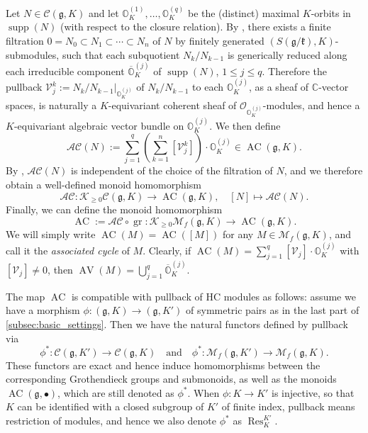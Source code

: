 \documentclass[11pt, a4paper]{amsart}
\newcommand{\C}{\mathbb{C}}
\newcommand{\g}{\mathfrak{g}}
\newcommand{\orb}{\mathbb{O}}
\newcommand{\orbk}{\orb_{K}}
\newcommand{\gr}{\operatorname{gr}}
\newcommand{\fk}{\mathfrak{k}}
\newcommand{\cC}{\mathcal{C}}
\newcommand{\cK}{\mathcal{K}}
\newcommand{\cM}{\mathcal{M}}
\newcommand{\cV}{\mathcal{V}}
\newcommand{\MgK}{\cM_f(\g,K)}
\DeclareMathOperator{\AV}{AV}
\DeclareMathOperator{\AC}{AC}
\DeclareMathOperator{\supp}{supp}
\DeclareMathOperator{\res}{Res}
\newcommand{\OO}{\mathcal{O}}
\theoremstyle{definition}
\numberwithin{equation}{section}
\begin{document}
Let $N \in \cC(\g,K)$ and let $\orbk^{(1)},\ldots ,\orbk^{(q)}$ be the (distinct) maximal $K$-orbits in $\supp(N)$ (with respect to the closure relation). 
By \cite[Lemma 2.9]{Vogan_AV}, there exists a finite filtration $0=N_0 \subset N_1 \subset \cdots \subset N_n$ of $N$ by finitely generated $(S(\g/\fk),K)$-submodules, such that each subquotient $N_k/N_{k-1}$ is generically reduced along each irreducible component $\overline{\orb}_K^{(j)}$ of $\supp(N)$, $1 \leqslant j \leqslant q$. Therefore the pullback $\cV_j^k:=N_k/N_{k-1}|_{\orbk^{(j)}}$ of $N_k/N_{k-1}$ to each $\orbk^{(j)}$, as a sheaf of $\C$-vector spaces, is naturally a $K$-equivariant coherent sheaf of $\OO_{\orbk^{(j)}}$-modules, and hence a $K$-equivariant algebraic vector bundle on $\orbk^{(j)}$.
We then define
	\[ \mathcal{AC}(N) :=  \sum_{j=1}^{q} \left( \sum_{k=1}^{n} [\cV_j^k] \right) \cdot \orbk^{(j)} \in \AC(\g,K). \]
By \cite[Theorem 2.13]{Vogan_AV}, $\mathcal{AC}(N)$ is independent of the choice of the filtration of $N$, and we therefore obtain a well-defined monoid homomorphism 
  \[ \mathcal{AC}: \cK_{\geqslant 0}\cC(\g,K) \rightarrow \AC(\g,K), \quad [N] \mapsto \mathcal{AC}(N).\]
Finally, we can define the monoid homomorphism
\[ \AC := \mathcal{AC} \circ \gr : \cK_{\geqslant 0}\MgK \rightarrow \AC(\g,K).\]
We will simply write $\AC(M) = \AC([M])$ for any $M \in \MgK$, and call it the \emph{associated cycle} of $M$. Clearly, if $\AC(M) = \sum_{j=1}^q [\cV_j] \cdot \orbk^{(j)}$ with $[\cV_j] \neq 0$, then $\AV(M) = \bigcup_{j=1}^q \overline{\orb}_K^{(j)}$.

The map $\AC$ is compatible with pullback of HC modules as follows: assume we have a morphism $\phi: (\g,K) \to (\g,K')$ of symmetric pairs as in the last part of \cref{subsec:basic_settings}. Then we have the natural functors defined by pullback via
	\[ \phi^*: \cC(\g,K') \to \cC(\g,K) \quad \text{and} \quad \phi^*: \cM_f(\g,K') \to \MgK.\]
These functors are exact and hence induce homomorphisms between the corresponding Grothendieck groups and submonoids, as well as the monoids $\AC(\g, \bullet)$, which are still denoted as $\phi^*$. When $\phi: K \to K'$ is injective, so that $K$ can be identified with a closed subgroup of $K'$ of finite index, pullback means restriction of modules, and hence we also denote $\phi^*$ as $\res_{K}^{K'}$.
\end{document}
